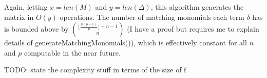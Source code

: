 Again, letting $x = len(M)$ and $y = len(\Delta)$, this algorithm generates the matrix in $O(y)$ operations. The number of matching monomials each term $\delta$ has is bounded above by $\binom{\lfloor \frac{n(p - 1)}{p} \rfloor + n - 1}{n}$ (I have a proof but requires me to explain details of generateMatchingMonomials()), which is effectively constant for all $n$ and $p$ computable in the near future.

TODO: state the complexity stuff in terms of the size of f


%	
%	
%
%
%
%
%
%
%
%
%
%
%
%
%
%
%
%
%
%
%
%
%
%	
%
%













